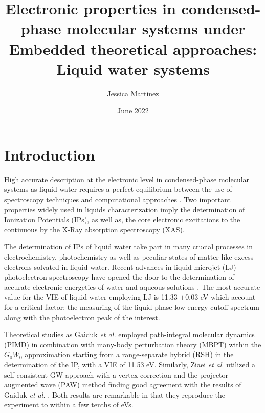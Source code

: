\documentclass[notitlepage,12pt]{report}
\begin{document}
	\title{Electronic properties in condensed-phase molecular systems under Embedded theoretical approaches: Liquid water systems}
	\author[1]{Jessica Martinez}
	\date{June 2022}
	\renewcommand\Affilfont{\itshape\small}
	\thispagestyle{empty}
\maketitle
\section{Introduction}

	High accurate description at the electronic level in condensed-phase molecular systems as liquid water requires a perfect equilibrium between the use of spectroscopy techniques\supercite{reimann2021two,malerz2021low,bolognesi2021combined} and computational approaches \supercite{couto2007understanding,ambrosio2016structural,ozaki2021advances}. Two important properties widely used in liquids characterization imply the determination of Ionization Potentials (IPs)\supercite{thurmer2021accurate,perry2020ionization,credidio2021quantitative,thurmer2021valence,tolle2019charged,gaiduk2018electron,gaiduk2016photoelectron,seidel2016valence}, as well as, the core electronic excitations to the continuous by the X-Ray absorption spectroscopy (XAS)\supercite{zhovtobriukh2019liquid,zhang2020isotope,smith2020femtosecond}.
	
	The determination of IPs of liquid water take part in many crucial processes in electrochemistry\supercite{marenich2014computational}, photochemistry\supercite{reuther1996primary,hu2021photochemical} as well as peculiar states of matter like excess electrons solvated in liquid water\supercite{ambrosio2017electronic}.  Recent advances in liquid microjet (LJ) photoelectron spectroscopy have opened the door to the determination of accurate electronic energetics of water and aqueous solutions \supercite{thurmer2021accurate,perry2020ionization,credidio2021quantitative,thurmer2021valence}. The most accurate value for the VIE of liquid water employing LJ is 11.33 $\pm$0.03 eV which account for a critical factor: the measuring of the liquid-phase low-energy cutoff spectrum along with the photoelectron peak of the interest\supercite{thurmer2021accurate}. 
	
	Theoretical studies as Gaiduk \textit{et al.} \supercite{gaiduk2018electron} employed path-integral molecular dynamics (PIMD) in combination with many-body perturbation theory (MBPT) within the $G_{0}W_{0}$ approximation starting from a range-separate hybrid (RSH) in the determination of the IP, with a VIE of 11.53 eV. Similarly, Ziaei \textit{et al}. \supercite{ziaei2018probing} utilized a self-consistent GW approach with a vertex correction and the projector augmented wave (PAW) method \supercite{dal2014pseudopotentials} finding  good agreement with the results of Gaiduk \textit{et al.} \supercite{gaiduk2018electron}. Both results are remarkable in that they reproduce the experiment to within a few tenths of eVs.
	
\end{document}
